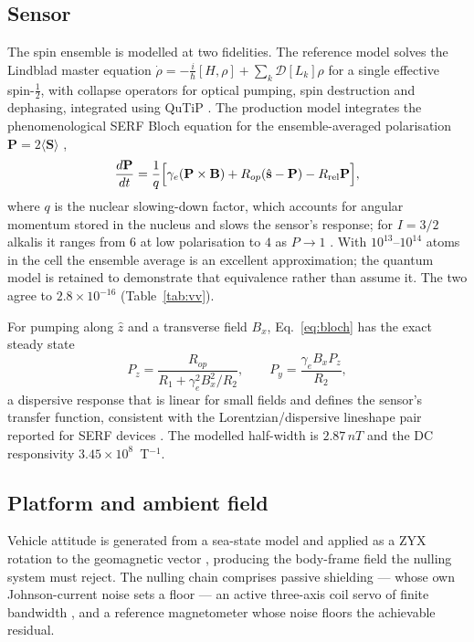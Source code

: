 \documentclass[11pt]{article}
\newcommand{\nT}{\,nT}\newcommand{\pT}{\,pT}\newcommand{\fT}{\,fT}
\begin{document}
\subsection{Sensor}
The spin ensemble is modelled at two fidelities. The reference model solves the
Lindblad master equation
$\dot\rho=-\tfrac{i}{\hbar}[H,\rho]+\sum_k\mathcal{D}[L_k]\rho$
\cite{lindblad1976,breuer2002} for a single effective spin-$\tfrac12$, with
collapse operators for optical pumping, spin destruction and dephasing,
integrated using QuTiP \cite{qutip2013}. The production model integrates the
phenomenological SERF Bloch equation for the ensemble-averaged polarisation
$\mathbf{P}=2\langle\mathbf{S}\rangle$ \cite{seltzer2008,borna2022},
\begin{equation}
\frac{d\mathbf{P}}{dt}=\frac{1}{q}\Big[\gamma_e(\mathbf{P}\times\mathbf{B})
+R_{op}(\hat{\mathbf{s}}-\mathbf{P})-R_{\rm rel}\mathbf{P}\Big],
\label{eq:bloch}
\end{equation}
where $q$ is the nuclear slowing-down factor, which accounts for angular momentum
stored in the nucleus and slows the sensor's response; for $I=3/2$ alkalis it
ranges from $6$ at low polarisation to $4$ as $P\to1$
\cite{savukov2005,seltzer2008}. With $10^{13}$--$10^{14}$ atoms in the cell
\cite{allred2002} the ensemble average is an excellent approximation; the quantum
model is retained to demonstrate that equivalence rather than assume it. The two
agree to $2.8\times10^{-16}$ (Table~\ref{tab:vv}).

For pumping along $\hat z$ and a transverse field $B_x$, Eq.~\eqref{eq:bloch} has
the exact steady state
\begin{equation}
P_z=\frac{R_{op}}{R_1+\gamma_e^{2}B_x^{2}/R_2},\qquad
P_y=\frac{\gamma_e B_x P_z}{R_2},
\label{eq:ss}
\end{equation}
a dispersive response that is linear for small fields and defines the sensor's
transfer function, consistent with the Lorentzian/dispersive lineshape pair
reported for SERF devices \cite{allred2002,seltzer2008}. The modelled half-width
is $2.87\nT$ and the DC responsivity $3.45\times10^{8}$~T$^{-1}$.

\subsection{Platform and ambient field}
Vehicle attitude is generated from a sea-state model and applied as a ZYX
rotation to the geomagnetic vector \cite{ncei}, producing the body-frame field
the nulling system must reject. The nulling chain comprises passive shielding
--- whose own Johnson-current noise sets a floor \cite{lee2008} --- an active
three-axis coil servo of finite bandwidth \cite{fang2012,seltzer2004}, and a
reference magnetometer whose noise floors the achievable residual.
\end{document}

